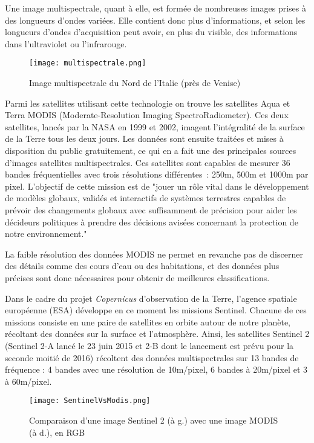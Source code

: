 Une image multispectrale, quant à elle, est formée de nombreuses images prises à des longueurs d'ondes variées. Elle contient donc plus d'informations, et selon les longueurs d'ondes d'acquisition peut avoir, en plus du visible, des informations dans l'ultraviolet ou l'infrarouge.

\begin{figure}[H]
  \centering
    \texttt{[image: multispectrale.png]}
  \caption{Image multispectrale du Nord de l'Italie (près de Venise)}
  \label{fig:veniseMulti}
\end{figure}

Parmi les satellites utilisant cette technologie on trouve les satellites Aqua et Terra MODIS (Moderate-Resolution Imaging SpectroRadiometer). Ces deux satellites, lancés par la NASA en 1999 et 2002, imagent l'intégralité de la surface de la Terre tous les deux jours. Les données sont ensuite traitées et mises à disposition du public gratuitement, ce qui en a fait une des principales sources d'images satellites multispectrales. Ces satellites sont capables de mesurer 36 bandes fréquentielles avec trois résolutions différentes : 250m, 500m et 1000m par pixel\cite{nasa}. L'objectif de cette mission est de "jouer un rôle vital dans le développement de modèles globaux, validés et interactifs de systèmes terrestres capables de prévoir des changements globaux avec suffisamment de précision pour aider les décideurs politiques à prendre des décisions avisées concernant la protection de notre environnement."

La faible résolution des données MODIS ne permet en revanche pas de discerner des détails comme des cours d'eau ou des habitations, et des données plus précises sont donc nécessaires pour obtenir de meilleures classifications. 

Dans le cadre du projet \textit{Copernicus} d'observation de la Terre, l'agence spatiale européenne (ESA) développe en ce moment les missions Sentinel. Chacune de ces missions consiste en une paire de satellites en orbite autour de notre planète, récoltant des données sur la surface et l'atmosphère. Ainsi, les satellites Sentinel 2 (Sentinel 2-A lancé le 23 juin 2015 et 2-B dont le lancement est prévu pour la seconde moitié de 2016)\cite{sent2} récoltent des données multispectrales sur 13 bandes de fréquence : 4 bandes avec une résolution de 10m/pixel, 6 bandes à 20m/pixel et 3 à 60m/pixel.

\begin{figure}[H]
  \centering
    \texttt{[image: SentinelVsModis.png]}
  \caption{Comparaison d'une image Sentinel 2 (à g.) avec une image MODIS (à d.), en RGB}
  \label{fig:ml}
\end{figure}

